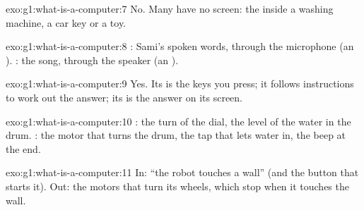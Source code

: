 \begin{solution}{exo:g1:what-is-a-computer:7}
No. Many  have no screen: the  inside a washing machine, a
car key or a toy.
\end{solution}

\begin{solution}{exo:g1:what-is-a-computer:8}
: Sami's spoken words, through the microphone (an ). :
the song, through the speaker (an ).
\end{solution}

\begin{solution}{exo:g1:what-is-a-computer:9}
Yes. Its  is the keys you press; it follows instructions to work out the
answer; its  is the answer on its screen.
\end{solution}

\begin{solution}{exo:g1:what-is-a-computer:10}
: the turn of the dial, the level of the water in the drum. : the
motor that turns the drum, the tap that lets water in, the beep at the end.
\end{solution}

\begin{solution}{exo:g1:what-is-a-computer:11}
In: ``the robot touches a wall'' (and the button that starts it). Out: the
motors that turn its wheels, which stop when it touches the wall.
\end{solution}
